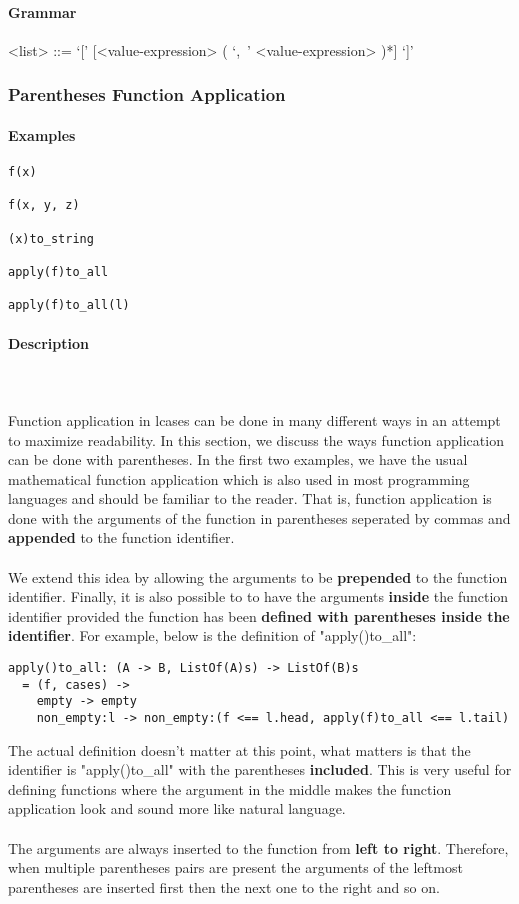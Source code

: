 \documentclass{article}
\def\pend{\mbox{} \\\\}
\begin{document}
\paragraph{Grammar}
\begin{grammar}
<list> ::= `[' [<value-expression> ( `,\ ' <value-expression> )*] `]'
\end{grammar}

\subsubsection{Parentheses Function Application}

\paragraph{Examples}

\begin{verbatim}
f(x)

f(x, y, z)

(x)to_string

apply(f)to_all

apply(f)to_all(l)
\end{verbatim}

\paragraph{Description}\pend
Function application in lcases can be done in many different ways in an attempt to 
maximize readability. In this section, we discuss the ways function application can
be done with parentheses. In the first two examples, we have the usual mathematical
function application which is also used in most programming languages and
should be familiar to the reader. That is, function application is done with the 
arguments of the function in parentheses seperated by commas and \textbf{appended}
to the function identifier.
\\\\
We extend this idea by allowing the arguments to be
\textbf{prepended} to the function identifier. Finally, it is also possible to
to have the arguments \textbf{inside} the function identifier provided the function
has been \textbf{defined with parentheses inside the identifier}. For example,
below is the definition of "apply()to\_all":

\begin{verbatim}
apply()to_all: (A -> B, ListOf(A)s) -> ListOf(B)s
  = (f, cases) ->
    empty -> empty
    non_empty:l -> non_empty:(f <== l.head, apply(f)to_all <== l.tail)
\end{verbatim}
The actual definition doesn't matter at this point, what matters is that the 
identifier is "apply()to\_all" with the parentheses \textbf{included}. This is very
useful for defining functions where the argument in the middle makes the function
application look and sound more like natural language.
\\\\
The arguments are always inserted to the function from \textbf{left to right}.
Therefore, when multiple parentheses pairs are present the arguments of the leftmost 
parentheses are inserted first then the next one to the right and so on.
\end{document}
